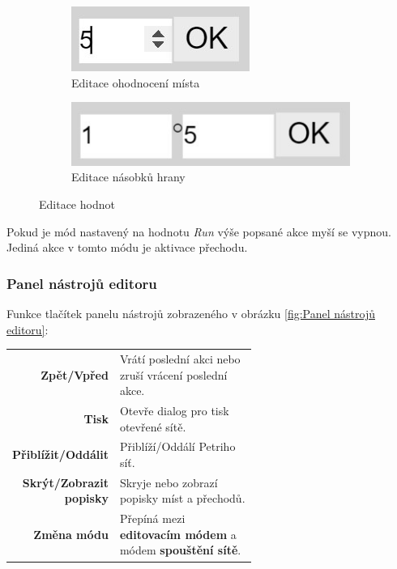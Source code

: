 \documentclass[
  biblatex,
  glossaries,
]{kidiplom}
\begin{document}
\begin{figure}[h]
  \centering
  \begin{subfigure}[h]{0,4\linewidth}
    \includegraphics{dialog_place}
    \caption{Editace ohodnocení místa}
  \end{subfigure}
  \begin{subfigure}[h]{0,4\linewidth}
    \includegraphics[width=\linewidth]{dialog_arc}
    \caption{Editace násobků hrany}
  \end{subfigure}
  \caption{Editace hodnot}
  \label{fig:editace hodnot}
\end{figure}

Pokud je mód nastavený na hodnotu \textit{Run} výše popsané akce myší 
se vypnou. Jediná akce v tomto módu je aktivace přechodu.

\clearpage
\subsubsection{Panel nástrojů editoru}\label{panel nástrojů}

Funkce tlačítek panelu nástrojů zobrazeného v obrázku \ref{fig:Panel nástrojů editoru}:
\begin{center}
  \begin{tabular}{r p{0.6\linewidth}}
    \textbf{Zpět/Vpřed}          & Vrátí poslední akci nebo zruší vrácení poslední akce. \\
    \textbf{Tisk}                & Otevře dialog pro tisk otevřené sítě. \\
    \textbf{Přiblížit/Oddálit}   & Přiblíží/Oddálí Petriho síť. \\
    \textbf{Skrýt/Zobrazit popisky}  & Skryje nebo zobrazí popisky míst a přechodů. \\
    \textbf{Změna módu}  & Přepíná mezi \textbf{editovacím módem} a módem \textbf{spouštění sítě}. \\
  \end{tabular}
\end{center}
\end{document}
